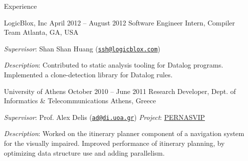 \documentclass{resume}
\begin{document}
\begin{rSection}{Experience}
\begin{rSubsection}{LogicBlox, Inc}
  {April 2012 -- August 2012}
  {Software Engineer Intern, Compiler Team}
  {Atlanta, GA, USA}
\item \emph{Supervisor}: Shan Shan Huang
  (\href{mailto:ssh@logicblox.com}{\nolinkurl{ssh@logicblox.com}})
\item \emph{Description}: Contributed to static analysis tooling for
  Datalog programs. Implemented a clone-detection library for Datalog
  rules.
\end{rSubsection}

\begin{rSubsection}
  {University of Athens}
  {October 2010 -- June 2011}
  {Research Developer, Dept. of Informatics \& Telecommunications}
  {Athens, Greece}
\item \emph{Supervisor}: Prof. Alex Delis
  (\href{mailto:ad@di.uoa.gr}{\nolinkurl{ad@di.uoa.gr}})
  \hfill{%
  \emph{Project}: \href{http://pernasvip.di.uoa.gr/index.php}{PERNASVIP}}
\item \emph{Description}: Worked on the itinerary planner component of
  a navigation system for the visually impaired. Improved performance
  of itinerary planning, by optimizing data structure use and adding
  parallelism.
\end{rSubsection}

\end{rSection}
\end{document}

